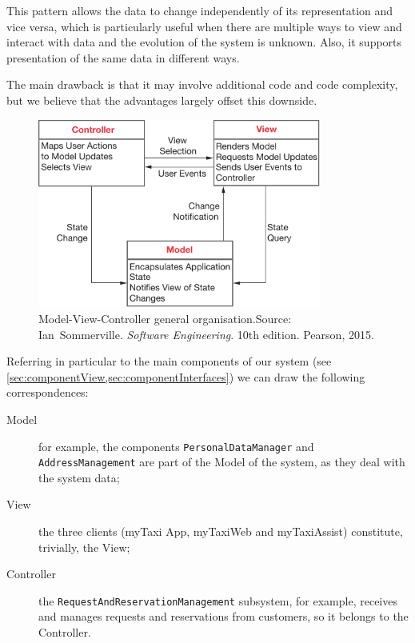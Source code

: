 This pattern allows the data to change independently of its representation and vice versa, which is particularly useful when there are multiple ways to view and interact with data and the evolution of the system is unknown. Also, it supports presentation of the same data in different ways.

The main drawback is that it may involve additional code and code complexity, but we believe that the advantages largely offset this downside.

\begin{figure}%
	\centering%
	\includegraphics[width=0.83\textwidth]{img/sommMVC}%
	\caption{Model-View-Controller general organisation.\hfill\break Source: Ian~Sommerville. \emph{Software Engineering}. 10th edition. Pearson, 2015.}\label{fig:mvc}%
\end{figure}

Referring in particular to the main components of our system (see \cref{sec:componentView,sec:componentInterfaces}) we can draw the following correspondences:

\begin{description}
	
	\item [Model] for example, the components \texttt{Per\-son\-al\-Data\-Man\-ager} and \texttt{Ad\-dress\-Man\-age\-ment} are part of the Model of the system, as they deal with the system data;
	
	\item [View] the three clients (myTaxi App, myTaxiWeb and myTaxiAssist) constitute, trivially, the View;
	
	\item [Controller] the \texttt{Re\-quest\-And\-Res\-er\-va\-tion\-Man\-age\-ment} subsystem, for example, receives and manages requests and reservations from customers, so it belongs to the Controller.
		
\end{description}
